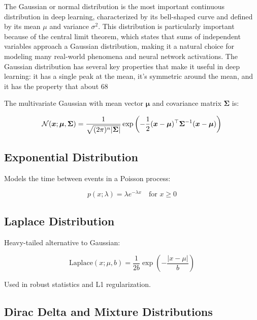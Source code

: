 The Gaussian or normal distribution is the most important continuous distribution in deep learning, characterized by its bell-shaped curve and defined by its mean $\mu$ and variance $\sigma^2$. This distribution is particularly important because of the central limit theorem, which states that sums of independent variables approach a Gaussian distribution, making it a natural choice for modeling many real-world phenomena and neural network activations. The Gaussian distribution has several key properties that make it useful in deep learning: it has a single peak at the mean, it's symmetric around the mean, and it has the property that about 68%

The multivariate Gaussian with mean vector $\boldsymbol{\mu}$ and covariance matrix $\boldsymbol{\Sigma}$ is:

\begin{equation}
\mathcal{N}(\boldsymbol{x}; \boldsymbol{\mu}, \boldsymbol{\Sigma}) = \frac{1}{\sqrt{(2\pi)^n |\boldsymbol{\Sigma}|}} \exp\left(-\frac{1}{2}(\boldsymbol{x}-\boldsymbol{\mu})^\top \boldsymbol{\Sigma}^{-1} (\boldsymbol{x}-\boldsymbol{\mu})\right)
\end{equation}

\subsection{Exponential Distribution}

Models the time between events in a Poisson process:

\begin{equation}
p(x; \lambda) = \lambda e^{-\lambda x} \quad \text{for } x \geq 0
\end{equation}

\subsection{Laplace Distribution}

Heavy-tailed alternative to Gaussian:

\begin{equation}
\text{Laplace}(x; \mu, b) = \frac{1}{2b} \exp\left(-\frac{|x-\mu|}{b}\right)
\end{equation}

Used in robust statistics and L1 regularization.

\subsection{Dirac Delta and Mixture Distributions}

